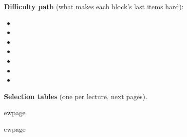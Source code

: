 \documentclass[11pt,a4paper]{article}
\begin{document}
\titulo
\howtouse

\medskip
{\small\noindent\textbf{Difficulty path} (what makes each block's last items hard):
\begin{itemize}[leftmargin=1.4em,itemsep=0pt]
\item \pathi
\item \pathii
\item \pathiii
\item \pathiv
\item \pathv
\item \pathvi
\item \pathvii
\end{itemize}\par}

\medskip
{\small\noindent\textbf{Selection tables} (one per lecture, next pages).\par}
\tablenote

\newpage
\selectiontable{\rowsi}
\selectiontable{\rowsii}
\selectiontable{\rowsiii}
\selectiontable{\rowsiv}
\selectiontable{\rowsv}

\newpage


\newpage


\newpage


\newpage


\newpage



ewpage



ewpage

\end{document}
